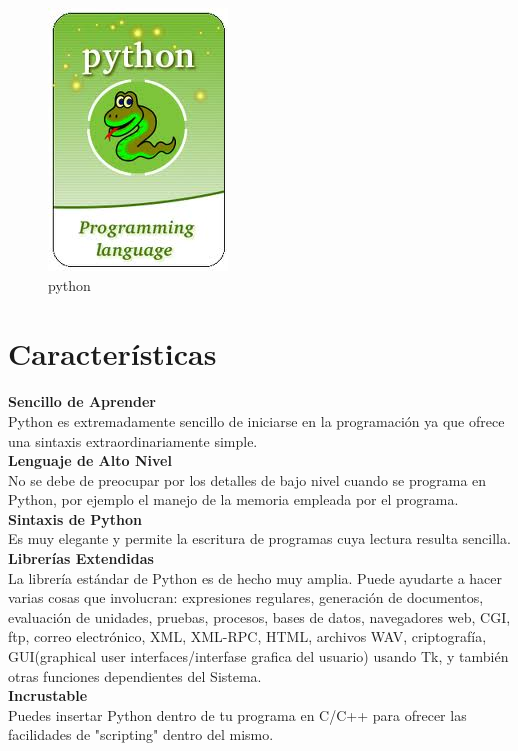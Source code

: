 \documentclass[11pt]{article} %
\begin{document}
\begin{figure}[htbp]
\begin{center}
\includegraphics[width=.30\textwidth]{./imagenes/pythonXD.jpg}
\caption{python}
\label{qt}
\end{center}
\end{figure}

\section{Características}

\textbf{Sencillo de Aprender}
\\    Python es extremadamente sencillo de iniciarse en la programación ya que ofrece una sintaxis extraordinariamente simple.\\

\textbf{Lenguaje de Alto Nivel}
\\    No se debe de preocupar por los detalles de bajo nivel cuando se programa en Python, por ejemplo el manejo de la memoria empleada por el programa.\\

\textbf{Sintaxis de Python}
\\	  Es muy elegante y permite la escritura de programas cuya lectura resulta sencilla.\\

\textbf{Librerías Extendidas}
\\	  La librería estándar de Python es de hecho muy amplia. Puede ayudarte a hacer varias cosas que involucran: expresiones regulares, generación de documentos, evaluación de unidades, pruebas, procesos, bases de datos, navegadores web, CGI, ftp, correo electrónico, XML, XML-RPC, HTML, archivos WAV, criptografía, GUI(graphical user interfaces/interfase grafica del usuario) usando Tk, y también otras funciones dependientes del Sistema.\\

\textbf{Incrustable}
\\    Puedes insertar Python dentro de tu programa en C/C++ para ofrecer las facilidades de "scripting" dentro del mismo.\\
\end{document}
